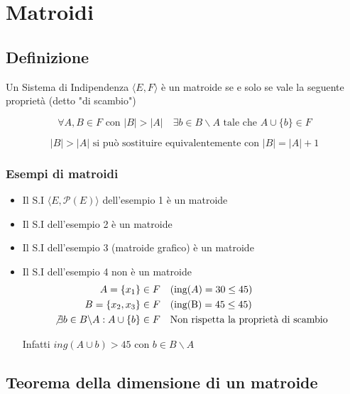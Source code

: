 \usetikzlibrary{shapes, backgrounds}

\chapter{Matroidi}

\section{Definizione}
Un Sistema di Indipendenza $\langle E,F \rangle$ è un matroide se e solo se vale la seguente proprietà (detto "di scambio")

{
    \large
    $$
    \forall A,B \in F \text{ con } |B| > |A| \quad \exists b \in B \backslash A \text{ tale che } A \cup \{b\} \in F
    $$

    $$
    |B| > |A| \text{ si può sostituire equivalentemente con } |B| = |A|+1 
    $$
}

\subsection{Esempi di matroidi}
\begin{itemize}
    \item Il S.I $\langle E, \mathcal{P}(E) \rangle$ dell'esempio 1 è un matroide
    \item Il S.I dell'esempio 2 è un matroide
    \item Il S.I dell'esempio 3 (matroide grafico) è un matroide
    \item Il S.I dell'esempio 4 non è un matroide
    $$
    \begin{aligned}
        A = \{x_1\} \in F & \quad (\text{ing}(A) = 30 \leq 45) \\
        B = \{x_2, x_3\} \in F & \quad (\text{ing(B)} = 45 \leq 45) \\
        \not \exists b \in B \backslash A : A \cup \{b\} \in F & \quad \text{Non rispetta la proprietà di scambio } \\ 
    \end{aligned}
    $$
    \begin{center}
        Infatti $ing(A \cup b) > 45$ con $b \in B \backslash A$
    \end{center}
\end{itemize}

\section{Teorema della dimensione di un matroide}

